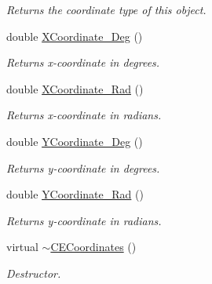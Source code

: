 \begin{DoxyCompactItemize}
\begin{DoxyCompactList}\small\item\em Returns the coordinate type of this object. \end{DoxyCompactList}\item 
\hypertarget{class_c_e_coordinates_af395e512aa731b34bd98fa775c2cdec1}{}double \hyperlink{class_c_e_coordinates_af395e512aa731b34bd98fa775c2cdec1}{X\+Coordinate\+\_\+\+Deg} ()\label{class_c_e_coordinates_af395e512aa731b34bd98fa775c2cdec1}

\begin{DoxyCompactList}\small\item\em Returns x-\/coordinate in degrees. \end{DoxyCompactList}\item 
\hypertarget{class_c_e_coordinates_a7b5d9f29881522423dc22e791a2a0377}{}double \hyperlink{class_c_e_coordinates_a7b5d9f29881522423dc22e791a2a0377}{X\+Coordinate\+\_\+\+Rad} ()\label{class_c_e_coordinates_a7b5d9f29881522423dc22e791a2a0377}

\begin{DoxyCompactList}\small\item\em Returns x-\/coordinate in radians. \end{DoxyCompactList}\item 
\hypertarget{class_c_e_coordinates_a4e8bf7f64f1adcec562a29f02c6a1d15}{}double \hyperlink{class_c_e_coordinates_a4e8bf7f64f1adcec562a29f02c6a1d15}{Y\+Coordinate\+\_\+\+Deg} ()\label{class_c_e_coordinates_a4e8bf7f64f1adcec562a29f02c6a1d15}

\begin{DoxyCompactList}\small\item\em Returns y-\/coordinate in degrees. \end{DoxyCompactList}\item 
\hypertarget{class_c_e_coordinates_a58a9b0ac531278f3e2b25e9590e0169f}{}double \hyperlink{class_c_e_coordinates_a58a9b0ac531278f3e2b25e9590e0169f}{Y\+Coordinate\+\_\+\+Rad} ()\label{class_c_e_coordinates_a58a9b0ac531278f3e2b25e9590e0169f}

\begin{DoxyCompactList}\small\item\em Returns y-\/coordinate in radians. \end{DoxyCompactList}\item 
\hypertarget{class_c_e_coordinates_afa88db6b0ad40202d69eabfb219c134f}{}virtual \hyperlink{class_c_e_coordinates_afa88db6b0ad40202d69eabfb219c134f}{$\sim$\+C\+E\+Coordinates} ()\label{class_c_e_coordinates_afa88db6b0ad40202d69eabfb219c134f}

\begin{DoxyCompactList}\small\item\em Destructor. \end{DoxyCompactList}\end{DoxyCompactItemize}
